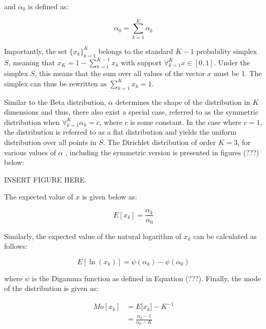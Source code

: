 and $\alpha_{0}$ is defined as:

\begin{equation}
\alpha_{0} = \sum_{k=1}^{K}\alpha_{k}
\end{equation}

Importantly, the set $\{x_{k}\}_{k=1}^{K}$ belongs to the standard $K-1$ probability simplex $S$, meaning that $x_{K} = 1 - \sum_{k=1}^{K-1}x_{k}$ with support $\forall_{k=1}^{K} x \in [0,1]$. Under the simplex $S$, this means that the sum over all values of the vector $x$ must be 1. The simplex can thus be rewritten as $\sum_{k=1}^{K}x_{k} = 1$.

Similar to the Beta distribution, $\alpha$ determines the shape of the distribution in $K$ dimensions and thus, there also exist a special case, referred to as the symmetric distribution when $\forall_{k=1}^{K} \alpha_{k} = c$, where $c$ is some constant. In the case where $c = 1$, the distribution is referred to as a flat distribution and yields the uniform distribution over all points in $S$. The Dirichlet distribution of order $K = 3$, for various values of $\alpha$ , including the symmetric version is presented in figures (???) below:

INSERT FIGURE HERE.


The expected value of $x$ is given below as:

\begin{equation}
E[x_{k}] = \frac{\alpha_{k}}{\alpha_{0}}
\end{equation}

Similarly, the expected value of the natural logarithm of $x_{k}$ can be calculated as follows:

\begin{equation}
E[\ln(x_{k})] = \psi({\alpha_{k}}) - \psi(\alpha_{0})
\end{equation}


where $\psi$ is the Digamma function as defined in Equation (???). Finally, the mode of the distribution is given as:

\begin{equation}
\begin{split}
	Mo[x_{k}] &= E[{x_{k}] -K^{-1}} \\
		&=  \frac{\alpha_{k} - 1}{\alpha_{0} - K}
\end{split}
\end{equation}













